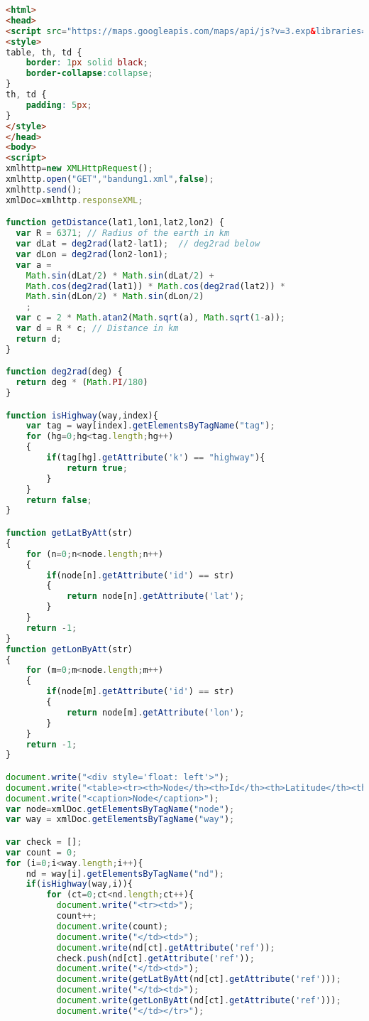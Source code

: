 \begin{lstlisting}[language=HTML,basicstyle=\tiny,caption=xml\_parsing.html]
<html>
<head>
<script src="https://maps.googleapis.com/maps/api/js?v=3.exp&libraries=geometry"></script>
<style>
table, th, td {
    border: 1px solid black;
    border-collapse:collapse;
}
th, td {
    padding: 5px;
}
</style>
</head>
<body>
<script>
xmlhttp=new XMLHttpRequest();
xmlhttp.open("GET","bandung1.xml",false);
xmlhttp.send();
xmlDoc=xmlhttp.responseXML;

function getDistance(lat1,lon1,lat2,lon2) {
  var R = 6371; // Radius of the earth in km
  var dLat = deg2rad(lat2-lat1);  // deg2rad below
  var dLon = deg2rad(lon2-lon1); 
  var a = 
    Math.sin(dLat/2) * Math.sin(dLat/2) +
    Math.cos(deg2rad(lat1)) * Math.cos(deg2rad(lat2)) * 
    Math.sin(dLon/2) * Math.sin(dLon/2)
    ; 
  var c = 2 * Math.atan2(Math.sqrt(a), Math.sqrt(1-a)); 
  var d = R * c; // Distance in km
  return d;
}

function deg2rad(deg) {
  return deg * (Math.PI/180)
}

function isHighway(way,index){
	var tag = way[index].getElementsByTagName("tag");
	for (hg=0;hg<tag.length;hg++)
	{
		if(tag[hg].getAttribute('k') == "highway"){
			return true;
		}
	}
	return false;
}

function getLatByAtt(str)
{
	for (n=0;n<node.length;n++)
	{
		if(node[n].getAttribute('id') == str)
		{
			return node[n].getAttribute('lat');
		}
	}
	return -1;
}
function getLonByAtt(str)
{
	for (m=0;m<node.length;m++)
	{
		if(node[m].getAttribute('id') == str)
		{
			return node[m].getAttribute('lon');
		}
	}
	return -1;
}

document.write("<div style='float: left'>");
document.write("<table><tr><th>Node</th><th>Id</th><th>Latitude</th><th>Longitude</th></tr>");
document.write("<caption>Node</caption>");
var node=xmlDoc.getElementsByTagName("node");
var way = xmlDoc.getElementsByTagName("way");

var check = [];
var count = 0; 
for (i=0;i<way.length;i++){
	nd = way[i].getElementsByTagName("nd");
	if(isHighway(way,i)){
		for (ct=0;ct<nd.length;ct++){
		  document.write("<tr><td>");
		  count++;
		  document.write(count);
		  document.write("</td><td>");
		  document.write(nd[ct].getAttribute('ref'));
		  check.push(nd[ct].getAttribute('ref'));
		  document.write("</td><td>");
		  document.write(getLatByAtt(nd[ct].getAttribute('ref')));
		  document.write("</td><td>");
		  document.write(getLonByAtt(nd[ct].getAttribute('ref')));
		  document.write("</td></tr>");
		  

\end{lstlisting}
